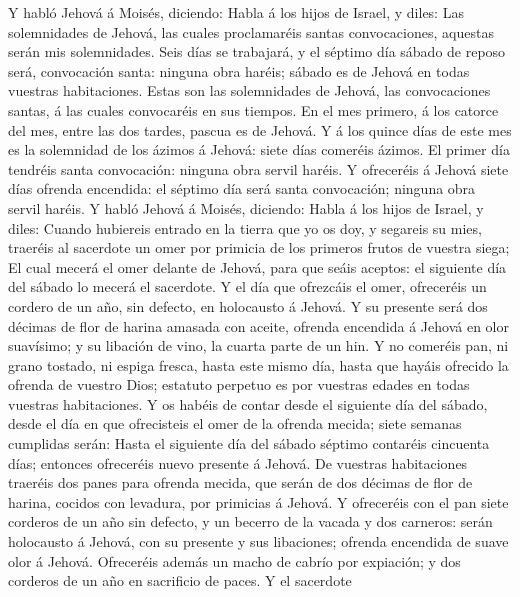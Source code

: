  Y habló Jehová á Moisés, diciendo:  Habla á los
hijos de Israel, y diles: Las solemnidades de Jehová, las cuales
proclamaréis santas convocaciones, aquestas serán mis solemnidades.
 Seis días se trabajará, y el séptimo día sábado de reposo
será, convocación santa: ninguna obra haréis; sábado es de Jehová en
todas vuestras habitaciones.  Estas son las solemnidades de
Jehová, las convocaciones santas, á las cuales convocaréis en sus
tiempos.  En el mes primero, á los catorce del mes, entre
las dos tardes, pascua es de Jehová.  Y á los quince días de
este mes es la solemnidad de los ázimos á Jehová: siete días comeréis
ázimos.  El primer día tendréis santa convocación: ninguna
obra servil haréis.  Y ofreceréis á Jehová siete días
ofrenda encendida: el séptimo día será santa convocación; ninguna obra
servil haréis.  Y habló Jehová á Moisés, diciendo:
 Habla á los hijos de Israel, y diles: Cuando hubiereis
entrado en la tierra que yo os doy, y segareis su mies, traeréis al
sacerdote un omer por primicia de los primeros frutos de vuestra siega;
 El cual mecerá el omer delante de Jehová, para que seáis
aceptos: el siguiente día del sábado lo mecerá el sacerdote.
 Y el día que ofrezcáis el omer, ofreceréis un cordero de
un año, sin defecto, en holocausto á Jehová.  Y su presente
será dos décimas de flor de harina amasada con aceite, ofrenda encendida
á Jehová en olor suavísimo; y su libación de vino, la cuarta parte de un
hin.  Y no comeréis pan, ni grano tostado, ni espiga
fresca, hasta este mismo día, hasta que hayáis ofrecido la ofrenda de
vuestro Dios; estatuto perpetuo es por vuestras edades en todas vuestras
habitaciones.  Y os habéis de contar desde el siguiente día
del sábado, desde el día en que ofrecisteis el omer de la ofrenda
mecida; siete semanas cumplidas serán:  Hasta el siguiente
día del sábado séptimo contaréis cincuenta días; entonces ofreceréis
nuevo presente á Jehová.  De vuestras habitaciones traeréis
dos panes para ofrenda mecida, que serán de dos décimas de flor de
harina, cocidos con levadura, por primicias á Jehová.  Y
ofreceréis con el pan siete corderos de un año sin defecto, y un becerro
de la vacada y dos carneros: serán holocausto á Jehová, con su presente
y sus libaciones; ofrenda encendida de suave olor á Jehová.
 Ofreceréis además un macho de cabrío por expiación; y dos
corderos de un año en sacrificio de paces.  Y el sacerdote
